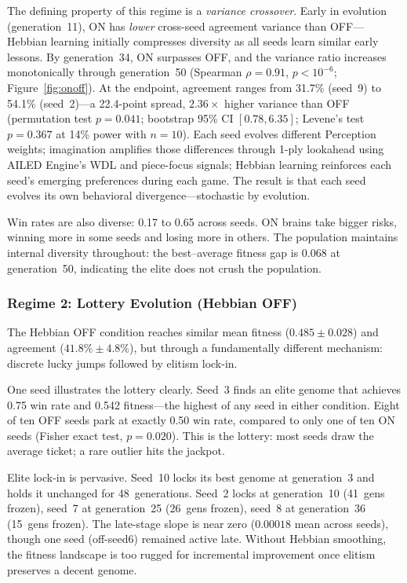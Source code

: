 \documentclass[11pt,a4paper]{article}
\begin{document}
The defining property of this regime is a \emph{variance crossover}.
Early in evolution (generation~11), ON has \emph{lower} cross-seed agreement variance than OFF---Hebbian learning initially compresses diversity as all seeds learn similar early lessons.
By generation~34, ON surpasses OFF, and the variance ratio increases monotonically through generation~50 (Spearman $\rho = 0.91$, $p < 10^{-6}$; Figure~\ref{fig:onoff}).
At the endpoint, agreement ranges from 31.7\% (seed~9) to 54.1\% (seed~2)---a 22.4-point spread, $2.36\times$ higher variance than OFF (permutation test $p = 0.041$; bootstrap 95\% CI $[0.78, 6.35]$; Levene's test $p = 0.367$ at 14\% power with $n = 10$).
Each seed evolves different Perception weights; imagination amplifies those differences through 1-ply lookahead using AILED Engine's WDL and piece-focus signals; Hebbian learning reinforces each seed's emerging preferences during each game.
The result is that each seed evolves its own behavioral divergence---stochastic by evolution.

Win rates are also diverse: 0.17 to 0.65 across seeds.
ON brains take bigger risks, winning more in some seeds and losing more in others.
The population maintains internal diversity throughout: the best--average fitness gap is $0.068$ at generation~50, indicating the elite does not crush the population.

\subsubsection{Regime 2: Lottery Evolution (Hebbian OFF)}

The Hebbian OFF condition reaches similar mean fitness ($0.485 \pm 0.028$) and agreement ($41.8\% \pm 4.8\%$), but through a fundamentally different mechanism: discrete lucky jumps followed by elitism lock-in.

One seed illustrates the lottery clearly.
Seed~3 finds an elite genome that achieves 0.75 win rate and 0.542 fitness---the highest of any seed in either condition.
Eight of ten OFF seeds park at exactly 0.50 win rate, compared to only one of ten ON seeds (Fisher exact test, $p = 0.020$).
This is the lottery: most seeds draw the average ticket; a rare outlier hits the jackpot.

Elite lock-in is pervasive.
Seed~10 locks its best genome at generation~3 and holds it unchanged for 48~generations.
Seed~2 locks at generation~10 (41~gens frozen), seed~7 at generation~25 (26~gens frozen), seed~8 at generation~36 (15~gens frozen).
The late-stage slope is near zero ($0.00018$ mean across seeds), though one seed (off-seed6) remained active late.
Without Hebbian smoothing, the fitness landscape is too rugged for incremental improvement once elitism preserves a decent genome.
\end{document}
